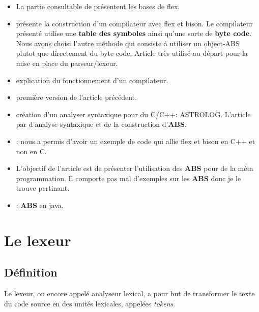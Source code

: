 \documentclass[a4paper]{article}
\begin{document}
\begin{itemize}
  \item La partie consultable de \cite{flexBisonHandbook} présentent les bases
    de flex.
  \item \cite{compilerFlexBison} présente la construction d'un compilateur avec
    flex et bison. Le compilateur présenté utilise une \textbf{table des
    symboles} ainsi qu'une sorte de \textbf{byte code}. Nous avons choisi
    l'autre méthode qui consiste à utiliser un object-ABS plutot que directement
    du byte code. Article très utilisé au départ pour la mise en place du
    parseur/lexeur.
  \item \cite{compilerTICH} explication du fonctionnement d'un compilateur.
  \item \cite{compilerTILB} première version de l'article précédent.
  \item \cite{crew1997astlog} création d'un analyser syntaxique pour du C/C++:
    ASTROLOG. L'article par d'analyse syntaxique et de la construction
    d'\textbf{ABS}.
  \item \cite{cppparsing}: nous a permis d'avoir un exemple de code qui allie
    flex et bison en C++ et non en C.
  \item \cite{visser2002meta} L'objectif de l'article est de présenter
    l'utilisation des \textbf{ABS} pour de la méta programmation. Il comporte
    pas mal d'exemples sur les \textbf{ABS} donc je le trouve pertinant.
  \item \cite{gagnon1998sablecc}: \textbf{ABS} en java.
\end{itemize}


\clearpage{}
\setcounter{secnumdepth}{1}
\section{Le lexeur}

\subsection{Définition}

 Le lexeur, ou encore appelé analyseur lexical, a pour but de transformer le texte du code source en des unités lexicales, appelées \textit{tokens}. \\
 
\end{document}
